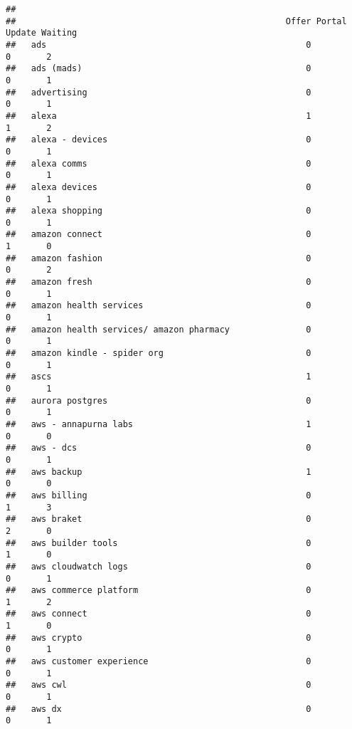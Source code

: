 \documentclass[
]{article}
\begin{document}
\begin{verbatim}
##                                                    
##                                                     Offer Portal Update Waiting
##   ads                                                   0             0       2
##   ads (mads)                                            0             0       1
##   advertising                                           0             0       1
##   alexa                                                 1             1       2
##   alexa - devices                                       0             0       1
##   alexa comms                                           0             0       1
##   alexa devices                                         0             0       1
##   alexa shopping                                        0             0       1
##   amazon connect                                        0             1       0
##   amazon fashion                                        0             0       2
##   amazon fresh                                          0             0       1
##   amazon health services                                0             0       1
##   amazon health services/ amazon pharmacy               0             0       1
##   amazon kindle - spider org                            0             0       1
##   ascs                                                  1             0       1
##   aurora postgres                                       0             0       1
##   aws - annapurna labs                                  1             0       0
##   aws - dcs                                             0             0       1
##   aws backup                                            1             0       0
##   aws billing                                           0             1       3
##   aws braket                                            0             2       0
##   aws builder tools                                     0             1       0
##   aws cloudwatch logs                                   0             0       1
##   aws commerce platform                                 0             1       2
##   aws connect                                           0             1       0
##   aws crypto                                            0             0       1
##   aws customer experience                               0             0       1
##   aws cwl                                               0             0       1
##   aws dx                                                0             0       1

\end{verbatim}
\end{document}
